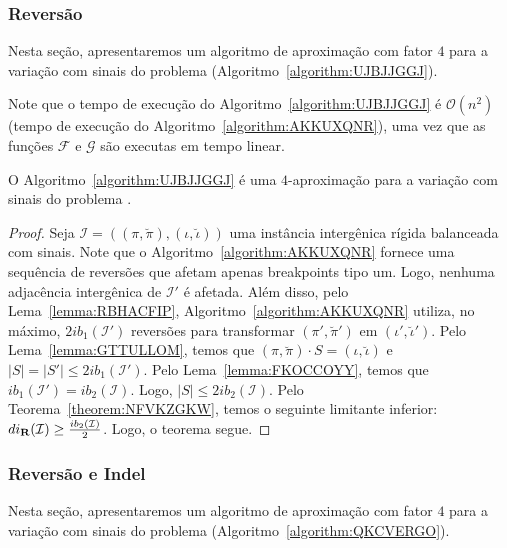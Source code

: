 \subsubsection{Reversão}

Nesta seção, apresentaremos um algoritmo de aproximação com fator $4$ para a variação com sinais do problema \SbIR{} (Algoritmo~\ref{algorithm:UJBJJGGJ}).



Note que o tempo de execução do Algoritmo~\ref{algorithm:UJBJJGGJ} é $\mathcal{O}(n^2)$ (tempo de execução do Algoritmo~\ref{algorithm:AKKUXQNR}), uma vez que as funções $\mathcal{F}$ e $\mathcal{G}$ são executas em tempo linear.

\begin{theorem}\label{theorem:DGTASCUU}
O Algoritmo~\ref{algorithm:UJBJJGGJ} é uma $4$-aproximação para a variação com sinais do problema \SbIR{}.
\end{theorem}
\begin{proof}
Seja $\mathcal{I} = ((\pi,\breve\pi),(\iota,\breve\iota))$ uma instância intergênica rígida balanceada com sinais. Note que o Algoritmo~\ref{algorithm:AKKUXQNR} fornece uma sequência de reversões que afetam apenas breakpoints tipo um. Logo, nenhuma adjacência intergênica de $\mathcal{I'}$ é afetada. Além disso, pelo Lema~\ref{lemma:RBHACFIP}, Algoritmo~\ref{algorithm:AKKUXQNR} utiliza, no máximo, $2ib_1(\mathcal{I'})$ reversões para transformar $(\pi',\breve\pi')$ em $(\iota',\breve\iota')$. Pelo Lema~\ref{lemma:GTTULLOM}, temos que $(\pi,\breve\pi) \cdot S = (\iota,\breve\iota)$ e $|S| = |S'| \le 2ib_1(\mathcal{I'})$. Pelo Lema~\ref{lemma:FKOCCOYY}, temos que $ib_1(\mathcal{I'}) = ib_2(\mathcal{I})$. Logo, $|S| \le 2ib_2(\mathcal{I})$. Pelo Teorema~\ref{theorem:NFVKZGKW}, temos o seguinte limitante inferior: $di_{\textbf{R}}(\mathcal{I}) \ge \frac{ib_2(\mathcal{I})}{2}$. Logo, o teorema segue.
\end{proof}

\subsubsection{Reversão e Indel}

Nesta seção, apresentaremos um algoritmo de aproximação com fator $4$ para a variação com sinais do problema \SbIRI{} (Algoritmo~\ref{algorithm:QKCVERGO}).

